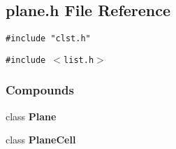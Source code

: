 \subsection{plane.h File Reference}
\label{plane.h}
{\tt \#include "clst.h"}\par
{\tt \#include $<$list.h$>$}\par
\subsubsection*{Compounds}
\begin{CompactItemize}
\item 
class {\bf Plane}
\item 
class {\bf Plane\-Cell}
\end{CompactItemize}
